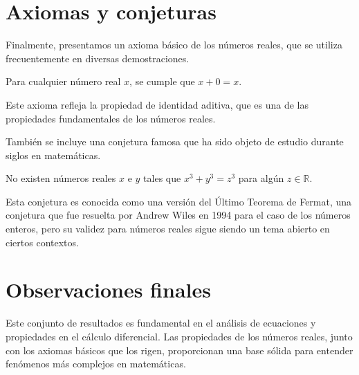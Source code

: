 \section{Axiomas y conjeturas}

Finalmente, presentamos un axioma básico de los números reales, que se utiliza frecuentemente en diversas demostraciones.

\begin{axiom}
Para cualquier número real $x$, se cumple que $x + 0 = x$.
\end{axiom}

Este axioma refleja la propiedad de identidad aditiva, que es una de las propiedades fundamentales de los números reales.

También se incluye una conjetura famosa que ha sido objeto de estudio durante siglos en matemáticas.

\begin{conjecture}
No existen números reales $x$ e $y$ tales que $x^3 + y^3 = z^3$ para algún $z \in \mathbb{R}$.
\end{conjecture}

Esta conjetura es conocida como una versión del Último Teorema de Fermat, una conjetura que fue resuelta por Andrew Wiles en 1994 para el caso de los números enteros, pero su validez para números reales sigue siendo un tema abierto en ciertos contextos.

\section{Observaciones finales}

Este conjunto de resultados es fundamental en el análisis de ecuaciones y propiedades en el cálculo diferencial. Las propiedades de los números reales, junto con los axiomas básicos que los rigen, proporcionan una base sólida para entender fenómenos más complejos en matemáticas.
